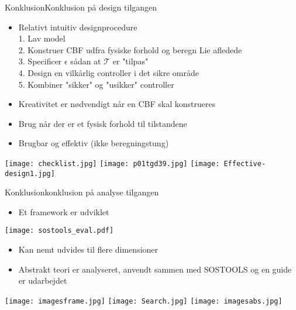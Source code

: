 \begin{frame}{Konklusion}{Konklusion på design tilgangen}
\begin{itemize}
	\item Relativt intuitiv designprocedure \\	\vspace*{0.08cm}
	\scriptsize {\color{white}{m}} 1. Lav model \\	
    \scriptsize {\color{white}{m}} 2. Konstruer CBF udfra fysiske forhold og beregn Lie afledede\\	
    \scriptsize {\color{white}{m}} 3. Specificer $\epsilon$ sådan at $\mathcal{T}$ er "tilpas" \\	
    \scriptsize {\color{white}{m}} 4. Design en vilkårlig controller i det sikre område \\ 	
    \scriptsize {\color{white}{m}} 5. Kombiner "sikker" og "usikker" controller \\
	\item \normalsize Kreativitet er nødvendigt når en CBF skal konstrueres
	\item Brug når der er et fysisk forhold til tilstandene
	\item Brugbar og effektiv (ikke beregningstung)
\end{itemize}
\vspace*{0.2cm}
\texttt{[image: checklist.jpg]} \hspace*{0.2cm}
\texttt{[image: p01tgd39.jpg]} \hspace*{0.2cm}
\texttt{[image: Effective-design1.jpg]}
\end{frame}



\begin{frame}{Konklusion}{konklusion på analyse tilgangen}
\begin{itemize}
	\item Et framework er udviklet
\end{itemize}

\texttt{[image: sostools\_eval.pdf]}

\begin{itemize}
	\item Kan nemt udvides til flere dimensioner
	\item Abstrakt teori er analyseret, anvendt sammen med SOSTOOLS og en guide er udarbejdet
\end{itemize}
\texttt{[image: imagesframe.jpg]} \hspace*{0.5cm}
\texttt{[image: Search.jpg]} \hspace*{0.5cm}
\texttt{[image: imagesabs.jpg]} 
\end{frame}

